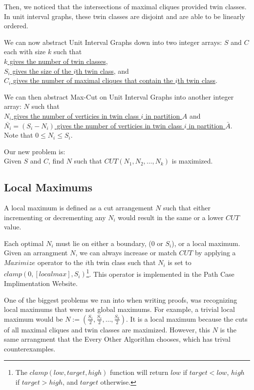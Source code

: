 \documentclass[12pt]{article}
\begin{document}
Then, we noticed that the intersections of maximal cliques provided twin classes. In unit interval graphs, these twin classes are disjoint and are able to be linearly ordered.

We can now abstract Unit Interval Graphs down into two integer arrays: $S$ and $C$ each with size $k$ such that \\
\underline{$k$ gives the number of twin classes}, \\
\underline{$S_i$ gives the size of the $i$th twin class}, and \\
\underline{$C_i$ gives the number of maximal cliques that contain the $i$th twin class}.

We can then abstract Max-Cut on Unit Interval Graphs into another integer array: $N$ such that \\
\underline{$N_i$ gives the number of verticies in twin class $i$ in partition $A$} and \\
\underline{$\bar{N_i}=(S_i - N_i)$ gives the number of verticies in twin class $i$ in partition $\bar{A}$}. \\
Note that $0 \leq N_i \leq S_i$.

Our new problem is: \\
Given $S$ and $C$, find $N$ such that $CUT(N_1, N_2, \ldots, N_k)$ is maximized.


\pagebreak

\subsection{Local Maximums}

A local maximum is defined as a cut arrangement $N$ such that either incrementing or decrementing any $N_i$ would result in the same or a lower $CUT$ value.

Each optimal $N_i$ must lie on either a boundary, ($0$ or $S_i$), or a local maximum. Given an arrangment $N$, we can always increase or match $CUT$ by applying a $Maximize$ operator to the $i$th twin class such that $N_i$ is set to $clamp(0, [local max], S_i)$\footnote{
    The $clamp(low, target, high)$ function will return
    $low$ if $target < low$,
    $high$ if $target > high$, and
    $target$ otherwise.
}. This operator is implemented in the Path Case Implimentation Website.

One of the biggest problems we ran into when writing proofs, was recognizing local maximums that were not global maximums. For example, a trivial local maximum would be $N := \left(\frac{S_1}{2}, \frac{S_s}{2}, \ldots, \frac{S_k}{2} \right)$. It is a local maximum because the cuts of all maximal cliques and twin classes are maximized. However, this $N$ is the same arrangment that the Every Other Algorithm chooses, which has trival counterexamples.
\end{document}
